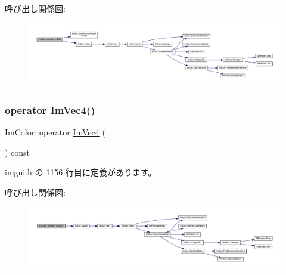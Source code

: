 呼び出し関係図\+:\nopagebreak
\begin{figure}[H]
\begin{center}
\leavevmode
\includegraphics[width=350pt]{struct_im_color_a4f4fc53e0676d50404d6d5ffcf16637f_cgraph}
\end{center}
\end{figure}
\mbox{\label{struct_im_color_a10f1de242f13c93f8be64545e4cbcb0a}} 
\subsubsection{\texorpdfstring{operator Im\+Vec4()}{operator ImVec4()}}
{\footnotesize\ttfamily Im\+Color\+::operator \mbox{\hyperlink{struct_im_vec4}{Im\+Vec4}} (\begin{DoxyParamCaption}{ }\end{DoxyParamCaption}) const\hspace{0.3cm}{\ttfamily [inline]}}



 imgui.\+h の 1156 行目に定義があります。

呼び出し関係図\+:\nopagebreak
\begin{figure}[H]
\begin{center}
\leavevmode
\includegraphics[width=350pt]{struct_im_color_a10f1de242f13c93f8be64545e4cbcb0a_cgraph}
\end{center}
\end{figure}
\mbox{\label{struct_im_color_afcff20160db703b956d56e5a9fa88e24}} 
